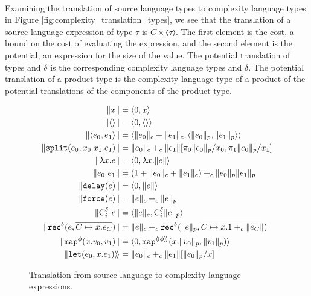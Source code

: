 \paragraph{}
Examining the translation of source language types to complexity language types
in Figure \ref{fig:complexity_translation_types}, we see that the translation
of a source language expression of type $\tau$ is
$\textit{C}\times\llangle\tau\rrangle$.  The first element is the cost, a bound
on the cost of evaluating the expression, and the second element is the
potential, an expression for the size of the value.  The potential translation
of types  and $\delta$ is the corresponding complexity language types
 and $\delta$. The potential translation of a product type is the
complexity language type of a product of the potential translations of the
components of the product type.
%
\begin{figure}
  \caption{Translation from source language to complexity language expressions.}
  \label{fig:complexity_translation_expressions}
  \begin{align*}
    \|x\| &= \langle 0, x \rangle \\
    \|\langle\rangle\| &= \langle 0, \langle\rangle\rangle \\
    \|\langle e_0,e_1 \rangle\| &= \langle \|e_0\|_c + \|e_1\|_c, \langle \|e_0\|_p, \|e_1\|_p\rangle\rangle \\
    \|\texttt{split}(e_0, x_0.x_1.e_1)\| &= \|e_0\|_c +_c \|e_1\|[\pi_0\|e_0\|_p/x_0, \pi_1\|e_0\|_p/x_1] \\
    \|\lambda x.e\| &= \langle 0, \lambda x.\|e\| \rangle \\
    \|e_0\ e_1\| &= (1 + \|e_0\|_c + \|e_1\|_c) +_c \|e_0\|_p \|e_1\|_p \\
    \|\texttt{delay}(e)\| &= \langle 0, \|e\|\rangle \\
    \|\texttt{force}(e)\| &= \|e\|_c +_c \|e\|_p \\
    \|\text{C}^\delta_i\ e\| &= \langle \|e\|_c, \text{C}^\delta_i \|e\|_p \rangle \\
    \|\texttt{rec}^\delta(e, \overline{C \mapsto x.e_C})\| &= \|e\|_c +_c \texttt{rec}^\delta(\|e\|_p, \overline{C \mapsto x.1 +_c \|e_C\|}) \\
    \|\texttt{map}^\phi(x.v_0, v_1)\| &= \langle 0, \texttt{map}^{\langle\!\langle \phi \rangle\!\rangle}(x.\|v_0\|_p, \|v_1\|_p)\rangle \\
    \|\texttt{let}(e_0, x.e_1)\rangle\!\rangle &= \|e_0\|_c +_c \|e_1\|[\|e_0\|_p/x]
  \end{align*}
\end{figure}



